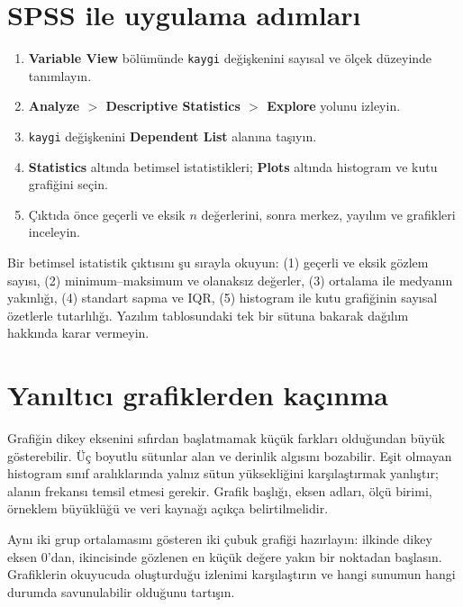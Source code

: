 \section{SPSS ile uygulama adımları}

\begin{enumerate}
  \item \textbf{Variable View} bölümünde \texttt{kaygi} değişkenini sayısal ve ölçek düzeyinde tanımlayın.
  \item \textbf{Analyze $>$ Descriptive Statistics $>$ Explore} yolunu izleyin.
  \item \texttt{kaygi} değişkenini \textbf{Dependent List} alanına taşıyın.
  \item \textbf{Statistics} altında betimsel istatistikleri; \textbf{Plots} altında histogram ve kutu grafiğini seçin.
  \item Çıktıda önce geçerli ve eksik $n$ değerlerini, sonra merkez, yayılım ve grafikleri inceleyin.
\end{enumerate}

\begin{outputguidebox}
Bir betimsel istatistik çıktısını şu sırayla okuyun: (1) geçerli ve eksik
gözlem sayısı, (2) minimum--maksimum ve olanaksız değerler, (3) ortalama ile
medyanın yakınlığı, (4) standart sapma ve IQR, (5) histogram ile kutu
grafiğinin sayısal özetlerle tutarlılığı. Yazılım tablosundaki tek bir sütuna
bakarak dağılım hakkında karar vermeyin.
\end{outputguidebox}

\section{Yanıltıcı grafiklerden kaçınma}

Grafiğin dikey eksenini sıfırdan başlatmamak küçük farkları olduğundan büyük
gösterebilir. Üç boyutlu sütunlar alan ve derinlik algısını bozabilir. Eşit
olmayan histogram sınıf aralıklarında yalnız sütun yüksekliğini karşılaştırmak
yanlıştır; alanın frekansı temsil etmesi gerekir. Grafik başlığı, eksen adları,
ölçü birimi, örneklem büyüklüğü ve veri kaynağı açıkça belirtilmelidir.

\begin{etkinlik}
Aynı iki grup ortalamasını gösteren iki çubuk grafiği hazırlayın: ilkinde
dikey eksen 0'dan, ikincisinde gözlenen en küçük değere yakın bir noktadan
başlasın. Grafiklerin okuyucuda oluşturduğu izlenimi karşılaştırın ve hangi
sunumun hangi durumda savunulabilir olduğunu tartışın.
\end{etkinlik}

